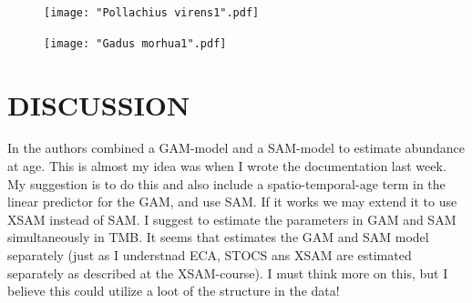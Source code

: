 \documentclass[a4paper 12pt]{article}
\numberwithin{equation}{section}
\begin{document}
\clearpage
\begin{figure}[h!]
  \centering
 {\texttt{[image: "Pollachius virens1".pdf]}}   
\end{figure}

\clearpage
\begin{figure}[h!]
  \centering
 {\texttt{[image: "Gadus morhua1".pdf]}}   
\end{figure}

\clearpage

\section{DISCUSSION}

In \citet{berg2014evaluation} the authors combined a GAM-model and a SAM-model to estimate abundance at age. This is almost my idea was when I wrote the documentation last week. My suggestion is to do this and also include a spatio-temporal-age term in the linear predictor for the GAM, and use SAM. If it works we may extend it to use XSAM instead of SAM. I suggest to estimate the parameters in GAM and SAM simultaneously in TMB. It seems that \citet{berg2014evaluation} estimates the GAM and SAM model separately (just as I understnad ECA, STOCS ans XSAM are estimated separately as described at the XSAM-course). I must think more on this, but I believe this could utilize a loot of the structure in the data!





\end{document}
